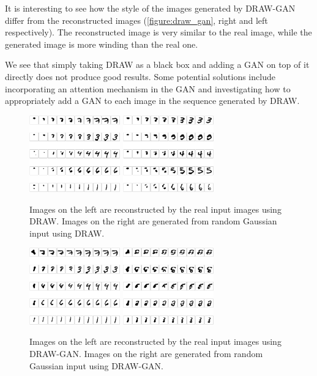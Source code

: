 \documentclass[10pt]{article}
\begin{document}
It is interesting to see how the style of the images generated by DRAW-GAN differ from the reconstructed images (\autoref{figure:draw_gan}, right and left respectively). The reconstructed image is very similar to the real image, while the generated image is more winding than the real one.

We see that simply taking DRAW as a black box and adding a GAN on top of it directly does not produce good results. Some potential solutions include incorporating an attention mechanism in the GAN and investigating how to appropriately add a GAN to each image in the sequence generated by DRAW.
\begin{figure}[!ht]
\centering
\includegraphics[width=0.35\textwidth]{images/draw_inference.png}
\includegraphics[width=0.35\textwidth]{images/draw_generate.png}
\caption{Images on the left are reconstructed by the real input images using DRAW. Images on the right are generated from random Gaussian input using DRAW. }
\label{figure:draw}
\end{figure}

\begin{figure}[!ht]
\centering
\includegraphics[width=0.35\textwidth]{images/drwa_gan_inference.png}
\includegraphics[width=0.35\textwidth]{images/draw_gan.png}
\caption{Images on the left are reconstructed by the real input images using DRAW-GAN. Images on the right are generated from random Gaussian input using DRAW-GAN. }
\label{figure:draw_gan}

\end{figure}
\end{document}
